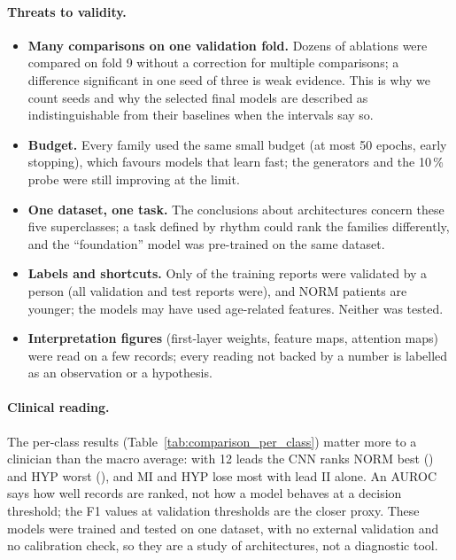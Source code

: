 \paragraph{Threats to validity.}
\begin{itemize}[leftmargin=1.2em,itemsep=1pt]
  \item \textbf{Many comparisons on one validation fold.} Dozens of ablations were compared on fold 9
        without a correction for multiple comparisons; a difference significant in one seed of three is
        weak evidence. This is why we count seeds and why the selected final models are described as
        indistinguishable from their baselines when the intervals say so.
  \item \textbf{Budget.} Every family used the same small budget (at most 50 epochs, early stopping),
        which favours models that learn fast; the generators and the 10\,\% probe were still improving at
        the limit.
  \item \textbf{One dataset, one task.} The conclusions about architectures concern these five superclasses;
        a task defined by rhythm could rank the families differently, and the
        ``foundation'' model was pre-trained on the same dataset.
  \item \textbf{Labels and shortcuts.} Only \edaFracValidatedByHumanTrainPct{} of the training reports
        were validated by a person (all validation and test reports were), and NORM patients are younger;
        the models may have used age-related features. Neither was tested.
  \item \textbf{Interpretation figures} (first-layer weights, feature maps, attention maps) were read
        on a few records; every reading not backed by a number is labelled as an observation or a
        hypothesis.
\end{itemize}

\paragraph{Clinical reading.} The per-class results (Table~\ref{tab:comparison_per_class}) matter more
to a clinician than the macro average: with 12 leads the CNN ranks NORM best
(\comparisonTestAurocNORMMeanTwelveCnn{}) and HYP worst (\comparisonTestAurocHYPMeanTwelveCnn{}), and
MI and HYP lose most with lead II alone. An AUROC says how well records are ranked, not how a model
behaves at a decision threshold; the F1 values at validation thresholds are the closer proxy. These
models were trained and tested on one dataset, with no external validation and no calibration check, so
they are a study of architectures, not a diagnostic tool.

